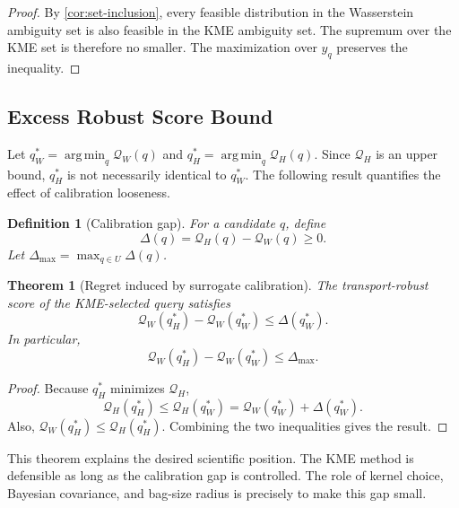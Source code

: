 \documentclass[10pt,journal]{IEEEtran}
\newtheorem{definition}{Definition}
\newtheorem{theorem}{Theorem}
\DeclareMathOperator*{\argmin}{arg\,min}
\begin{document}
\begin{proof}
By \cref{cor:set-inclusion}, every feasible distribution in the Wasserstein ambiguity set is also feasible in the KME ambiguity set. The supremum over the KME set is therefore no smaller. The maximization over $y_q$ preserves the inequality.
\end{proof}

\subsection{Excess Robust Score Bound}

Let $q_W^*=\argmin_q\mathcal{Q}_W(q)$ and $q_H^*=\argmin_q\mathcal{Q}_H(q)$. Since $\mathcal{Q}_H$ is an upper bound, $q_H^*$ is not necessarily identical to $q_W^*$. The following result quantifies the effect of calibration looseness.

\begin{definition}[Calibration gap]
For a candidate $q$, define
\begin{equation}
    \Delta(q)=\mathcal{Q}_H(q)-\mathcal{Q}_W(q)\ge 0.
\end{equation}
Let $\Delta_{\max}=\max_{q\in U}\Delta(q)$.
\end{definition}

\begin{theorem}[Regret induced by surrogate calibration]
\label{thm:regret}
The transport-robust score of the KME-selected query satisfies
\begin{equation}
    \mathcal{Q}_W(q_H^*)-\mathcal{Q}_W(q_W^*)\le \Delta(q_W^*).
\end{equation}
In particular,
\begin{equation}
    \mathcal{Q}_W(q_H^*)-\mathcal{Q}_W(q_W^*)\le \Delta_{\max}.
\end{equation}
\end{theorem}

\begin{proof}
Because $q_H^*$ minimizes $\mathcal{Q}_H$,
\begin{equation}
    \mathcal{Q}_H(q_H^*)\le \mathcal{Q}_H(q_W^*)=\mathcal{Q}_W(q_W^*)+\Delta(q_W^*).
\end{equation}
Also, $\mathcal{Q}_W(q_H^*)\le \mathcal{Q}_H(q_H^*)$. Combining the two inequalities gives the result.
\end{proof}

This theorem explains the desired scientific position. The KME method is defensible as long as the calibration gap is controlled. The role of kernel choice, Bayesian covariance, and bag-size radius is precisely to make this gap small.
\end{document}
